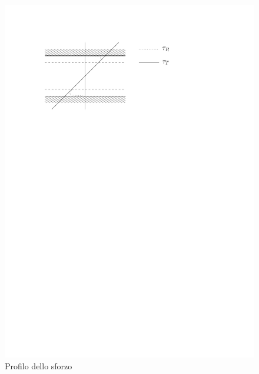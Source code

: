 	\begin{figure}[ht]
		\includegraphics[scale=0.9]{./8.2 Equazioni del moto turbolento/8.2-2}
		\centering
		\caption{Profilo dello sforzo}
	\end{figure}
% 

